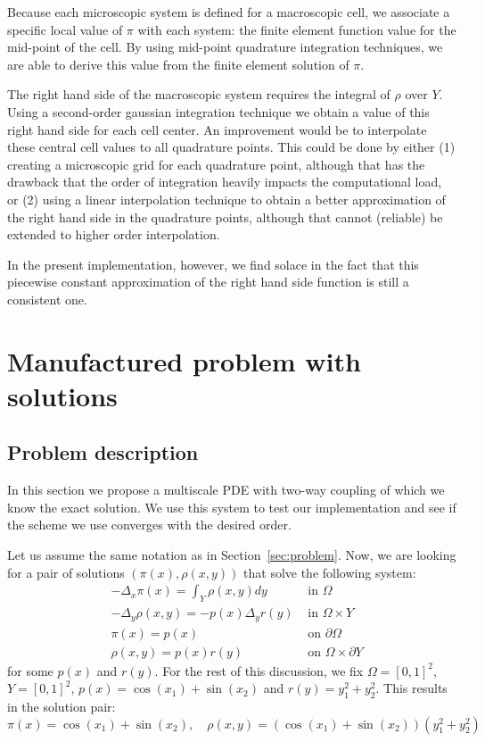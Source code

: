 \documentclass{article}
\begin{document}
Because each microscopic system is defined for a macroscopic cell, we associate a specific local value of $\pi$ with each system: the finite element function value for the mid-point of the cell.
By using mid-point quadrature integration techniques, we are able to derive this value from the finite element solution of $\pi$.

The right hand side of the macroscopic system requires the integral of $\rho$ over $Y$. Using a second-order gaussian integration technique we obtain a value of this right hand side for each cell center.
An improvement would be to interpolate these central cell values to all quadrature points.
This could be done by either (1) creating a microscopic grid for each quadrature point, although that has the drawback that the order of integration heavily impacts the computational load, or (2) using a linear interpolation technique to obtain a better approximation of the right hand side in the quadrature points, although that cannot (reliable) be extended to higher order interpolation.

In the present implementation, however, we find solace in the fact that this piecewise constant approximation of the right hand side function is still a consistent one.
\section{Manufactured problem with solutions}

\subsection{Problem description}
\label{sub:problem_description}

\label{sec:manufactured}
In this section we propose a multiscale PDE with two-way coupling of which we know the exact solution. We use this system to test our implementation and see if the scheme we use converges with the desired order.

Let us assume the same notation as in Section~\ref{sec:problem}.
Now, we are looking for a pair of solutions $(\pi(x),\rho(x,y))$ that solve the following system:
\begin{align}
    \label{eq:man_ellip}&-\Delta_x \pi(x) = \int_Y \rho(x,y) dy &\mbox{ in } \Omega\\
    \label{eq:man_para}&- \Delta_y \rho(x,y) = -p(x)\Delta_y r(y) &\mbox{ in }  \Omega\times Y \\
    \label{eq:man_ell_bc}&\pi(x) = p(x)  &\mbox{ on } \partial \Omega \\
    \label{eq:man_para_bc}&\rho(x,y) = p(x)r(y) &\mbox{ on } \Omega \times \partial Y
\end{align}
for some $p(x)$ and $r(y)$.
For the rest of this discussion, we fix $\Omega = [0,1]^2$, $Y = [0,1]^2$, $p(x) = \cos(x_1) + \sin(x_2)$ and $r(y) = y_1^2 + y_2^2$.
This results in the solution pair:
\begin{equation}
    \pi(x) =  \cos(x_1) + \sin(x_2),\quad \rho(x,y) = \left( \cos(x_1) + \sin(x_2) \right) \left(  y_1^2 + y_2^2 \right)
\end{equation}
\end{document}
